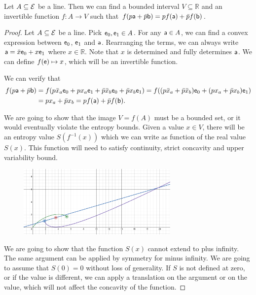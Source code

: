 \begin{thrm}
	Let $A \subseteq \Ens$ be a line. Then we can find a bounded interval $V \subseteq \mathbb{R}$ and an invertible function $f : A \to V$ such that $f(p \ens[a] + \bar{p} \ens[b]) = p f(\ens[a]) + \bar{p} f(\ens[b])$.
\end{thrm}

\begin{proof}
	Let $A \subseteq \Ens$ be a line. Pick $\ens_0, \ens_1 \in A$. For any $\ens[a] \in A$, we can find a convex expression between $\ens_0$, $\ens_1$ and $\ens[a]$. Rearranging the terms, we can always write $\ens[a] = \bar{x}\ens_0 + x\ens_1$ where $x \in \mathbb{R}$. Note that $x$ is determined and fully determines $\ens[a]$. We can define $f(\ens) \mapsto x$, which will be an invertible function.
	
	We can verify that
	\begin{equation}
		\begin{aligned}
			f(p\ens[a] + \bar{p} \ens[b]) &= f(p\bar{x}_a \ens_0 + px_a \ens_1 + \bar{p}\bar{x}_b \ens_0 + \bar{p}x_b \ens_1) = f((p\bar{x}_a + \bar{p}\bar{x}_b) \ens_0 + (px_a + \bar{p}x_b) \ens_1) \\
			&= px_a + \bar{p}x_b = pf(\ens[a]) + \bar{p}f(\ens[b]).
		\end{aligned}
	\end{equation}
	
	We are going to show that the image $V=f(A)$ must be a bounded set, or it would eventually violate the entropy bounds. Given a value $x \in V$, there will be an entropy value $S(f^{-1}(x))$ which we can write as function of the real value $S(x)$. This function will need to satisfy continuity, strict concavity and upper variability bound.

\begin{figure}[h]
	\centering
	\includegraphics[width=0.7\textwidth]{tempimages/BoundsFromEntropy.png}
\end{figure}
	We are going to show that the function $S(x)$ cannot extend to plus infinity. The same argument can be applied by symmetry for minus infinity. We are going to assume that $S(0) = 0$ without loss of generality. If $S$ is not defined at zero, or if the value is different, we can apply a translation on the argument or on the value, which will not affect the concavity of the function.
	

\end{proof}
